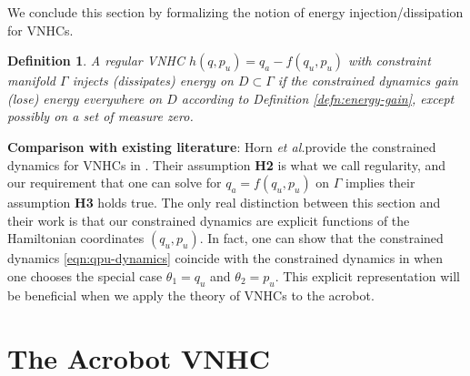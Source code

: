 \documentclass[journal,twoside,onecolumn,draftclsnofoot,web]{ieeecolor}
\newtheorem{defn}{Definition} %
\newcommand*{\etal}{\MakeLowercase{\textit{et al.}}}
\begin{document}
We conclude this section by formalizing the notion of energy
injection/dissipation for VNHCs.

\begin{defn}\label{defn:energy-injection}
    A regular VNHC \(h(q,p_u) = q_a - f(q_u,p_u)\) with constraint manifold \(\Gamma\)
    \textit{injects (dissipates) energy on \(D \subset \Gamma\)} if the
    constrained dynamics gain (lose) energy everywhere on \(D\) according to
    Definition \ref{defn:energy-gain}, except possibly on a set of measure
    zero.
\end{defn}

\textbf{Comparison with existing literature}: Horn \etal provide the constrained
dynamics for VNHCs in \cite{nhvc_incline_walking}.
Their assumption \textbf{H2} is what we call regularity, and our requirement
that one can solve for \(q_a = f(q_u,p_u)\) on \(\Gamma\) implies their
assumption \textbf{H3} holds true.
The only real distinction between this section and their work is that
our constrained dynamics are explicit functions of the Hamiltonian coordinates
\((q_u,p_u)\).
In fact, one can show that the constrained dynamics \eqref{eqn:qpu-dynamics}
coincide with the constrained dynamics in
\cite[Eqn. (17)]{hybrid_zero_dynamics_bipedal_nhvcs}
when one chooses the special case \(\theta_1 = q_u\) and 
\(\theta_2 = p_u\).
This explicit representation will be beneficial when we apply the theory of
VNHCs to the acrobot.

\section{The Acrobot VNHC}\label{sec:acrobot}
\end{document}
